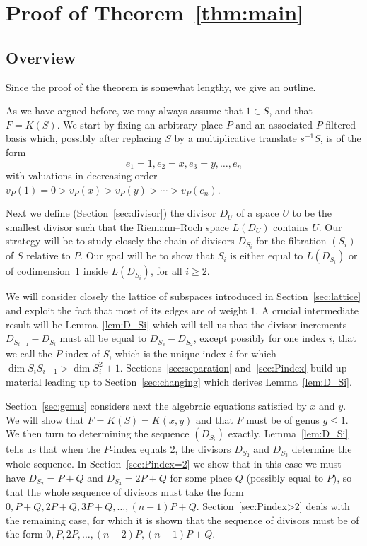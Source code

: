 \documentclass[ALCO,Unicode,ThmDefs]{cedram}
\renewcommand{\geq}{\geqslant}
\renewcommand{\leq}{\leqslant}
\begin{document}
\section{Proof of Theorem~\ref{thm:main}}\label{sec:proof_main}

\subsection{Overview} Since the proof of the theorem is somewhat lengthy, we give an outline.

As we have argued before, we may always assume that $1\in S$, and that $F=K(S)$. We start by fixing an arbitrary place $P$ and an associated $P$-filtered basis which, possibly after replacing $S$ by a multiplicative translate $s^{-1}S$, is of the form
\[
e_1=1,e_2=x,e_3=y,\ldots, e_n
\]
with valuations in decreasing order $v_P(1)=0>v_P(x)>v_P(y)>\cdots >v_P(e_n)$.

Next we define (Section~\ref{sec:divisor}) the divisor $D_U$ of a space $U$ to be the smallest divisor such that the Riemann--Roch space {$L(D_U)$} contains $U$. Our strategy will be to study closely the chain of divisors $D_{S_i}$ for the filtration $(S_i)$ of $S$ relative to $P$. Our goal will be to show that $S_i$ is either equal to $L(D_{S_i})$ or of codimension~$1$ inside $L(D_{S_i})$, for all $i\geq2$.

We will consider closely the lattice of subspaces introduced in Section~\ref{sec:lattice} and exploit the fact that most of its edges are of weight $1$. A crucial intermediate result will be Lemma~\ref{lem:D_Si} which will tell us that the divisor increments $D_{S_{i+1}}-D_{S_i}$ must all be equal to $D_{S_3}-D_{S_2}$, except possibly for one index $i$, that we call the $P$-index of $S$, which is the unique index $i$ for which $\dim S_iS_{i+1}>\dim S_i^2+1$. Sections~\ref{sec:separation} and~\ref{sec:Pindex} build up material leading up to Section~\ref{sec:changing} which derives Lemma~\ref{lem:D_Si}.

Section~\ref{sec:genus} considers next the algebraic equations satisfied by $x$ and $y$. We will show that $F=K(S)=K(x,y)$ and that $F$ must be of genus $g\leq1$. We then turn to determining the sequence $(D_{S_i})$ exactly. Lemma~\ref{lem:D_Si} tells us that when the $P$-index equals $2$, the divisors $D_{S_2}$ and $D_{S_3}$ determine the whole sequence. In Section~\ref{sec:Pindex=2} we show that in this case we must have $D_{S_2}=P+Q$ and $D_{S_3}=2P+Q$ for some place $Q$ (possibly equal to $P$), so that the whole sequence of divisors must take the form $0,P+Q,2P+Q,3P+Q,\ldots,(n-1)P+Q$. Section~\ref{sec:Pindex>2} deals with the remaining case, for which it is shown that the sequence of divisors must be of the form $0,P,2P,\ldots,(n-2)P,(n-1)P+Q$.
\end{document}
